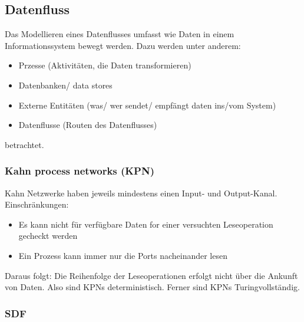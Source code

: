 \subsection{Datenfluss}

Das Modellieren eines Datenflusses umfasst wie Daten in einem Informationssystem bewegt werden.
Dazu werden unter anderem:
\begin{itemize}
    \item Przesse (Aktivitäten, die Daten transformieren)
    \item Datenbanken/ data stores
    \item Externe Entitäten (was/ wer sendet/ empfängt daten ins/vom System)
    \item Datenflusse (Routen des Datenflusses)
\end{itemize}
betrachtet.


\subsubsection{Kahn process networks (KPN)}

Kahn Netzwerke haben jeweils mindestens einen Input- und Output-Kanal.
Einschränkungen:
\begin{itemize}
    \item Es kann nicht für verfügbare Daten for einer versuchten Leseoperation gecheckt werden
    \item Ein Prozess kann immer nur die Ports nacheinander lesen
\end{itemize}
Daraus folgt:
Die Reihenfolge der Leseoperationen erfolgt nicht über die Ankunft von Daten. Also sind KPNs deterministisch.
Ferner sind KPNs Turingvollständig.

\subsubsection{SDF}
